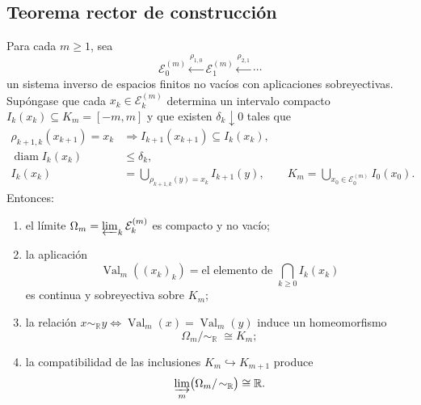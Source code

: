 \subsection{Teorema rector de construcci\'on}

\begin{theorem}
\label{thm:rector-construccion-continuo}
Para cada \(m\geq1\), sea
\[
 \mathcal E_0^{(m)}
 \xleftarrow{\rho_{1,0}}
 \mathcal E_1^{(m)}
 \xleftarrow{\rho_{2,1}}\cdots
\]
un sistema inverso de espacios finitos no vac\'ios con aplicaciones
sobreyectivas. Sup\'ongase que cada \(x_k\in\mathcal E_k^{(m)}\) determina un
intervalo compacto \(I_k(x_k)\subseteq K_m=[-m,m]\) y que existen
\(\delta_k\downarrow0\) tales que
\begin{align}
 \rho_{k+1,k}(x_{k+1})=x_k
 &\Longrightarrow I_{k+1}(x_{k+1})\subseteq I_k(x_k),
 \label{eq:encaje-cilindros-rector}\\
 \operatorname{diam}I_k(x_k)&\leq\delta_k,
 \label{eq:contraccion-cilindros-rector}\\
 I_k(x_k)&=
 \bigcup_{\rho_{k+1,k}(y)=x_k}I_{k+1}(y),
 \qquad
 K_m=\bigcup_{x_0\in\mathcal E_0^{(m)}}I_0(x_0).
 \label{eq:cobertura-cilindros-rector}
\end{align}
Entonces:
\begin{enumerate}[label=\textup{(\alph*)}]
 \item el l\'imite
 \(\Omega_m=\varprojlim_k\mathcal E_k^{(m)}\) es compacto y no vac\'io;
 \item la aplicaci\'on
 \begin{equation}
  \operatorname{Val}_m((x_k)_k)=
  \text{el elemento de }\bigcap_{k\geq0}I_k(x_k)
  \label{eq:valor-rector}
 \end{equation}
 es continua y sobreyectiva sobre \(K_m\);
 \item la relaci\'on
 \(x\sim_{\mathbb R}y\Longleftrightarrow
 \operatorname{Val}_m(x)=\operatorname{Val}_m(y)\) induce un homeomorfismo
 \begin{equation}
  \Omega_m/\!\sim_{\mathbb R}\;\cong K_m;
  \label{eq:cociente-rector-compacto}
 \end{equation}
 \item la compatibilidad de las inclusiones \(K_m\hookrightarrow K_{m+1}\)
 produce
 \begin{equation}
  \varinjlim_m\bigl(\Omega_m/\!\sim_{\mathbb R}\bigr)
  \cong\mathbb R.
  \label{eq:agotamiento-real-rector}
 \end{equation}
\end{enumerate}

\end{theorem}
